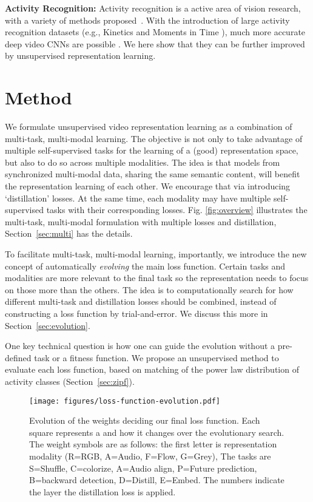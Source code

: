 \documentclass[10pt,twocolumn,letterpaper]{article}
\begin{document}
\textbf{Activity Recognition:} Activity recognition is a active area of vision research, with a variety of methods proposed~\cite{wang2011action,tran2014c3d,simonyan2014two,feichtenhofer2018slowfast}. With the introduction of large activity recognition datasets (e.g., Kinetics and Moments in Time \cite{kay2017kinetics,monfort2018moments}), much more accurate deep video CNNs are possible \cite{carreira2017quo}. We here show that they can be further improved by unsupervised representation learning.







\section{Method}
We formulate unsupervised video representation learning as a combination of multi-task, multi-modal learning. The objective is not only to take advantage of multiple self-supervised tasks for the learning of a (good) representation space, but also to do so across multiple modalities. The idea is that models from synchronized multi-modal data, sharing the same semantic content, will benefit the representation learning of each other. We encourage that via introducing `distillation' losses. At the same time, each modality may have multiple self-supervised tasks with their corresponding losses. Fig. \ref{fig:overview} illustrates the multi-task, multi-modal formulation with multiple losses and distillation, Section~\ref{sec:multi} has the details.


To facilitate multi-task, multi-modal learning, importantly, we introduce the new concept of automatically \emph{evolving} the main loss function. Certain tasks and modalities are more relevant to the final task so the representation needs to focus on those more than the others. The idea is to computationally search for how different multi-task and distillation losses should be combined, instead of constructing a loss function by trial-and-error. We discuss this more in Section~\ref{sec:evolution}. 

One key technical question is how one can guide the evolution without a pre-defined task or a fitness function. We propose an unsupervised method to evaluate each loss function, based on matching of the power law distribution of activity classes (Section~\ref{sec:zipf}).



\begin{figure*}
    \centering
    \texttt{[image: figures/loss-function-evolution.pdf]}
    \caption{Evolution of the weights deciding our final loss function. Each square represents a  and how it changes over the evolutionary search. 
    The weight symbols are as follows: the first letter is representation modality (R=RGB, A=Audio, F=Flow, G=Grey), The tasks are S=Shuffle, C=colorize, A=Audio align, P=Future prediction, B=backward detection, D=Distill, E=Embed. The numbers indicate the layer the distillation loss is applied.}
    \label{fig:loss-fn-evol}
\end{figure*}
\end{document}
